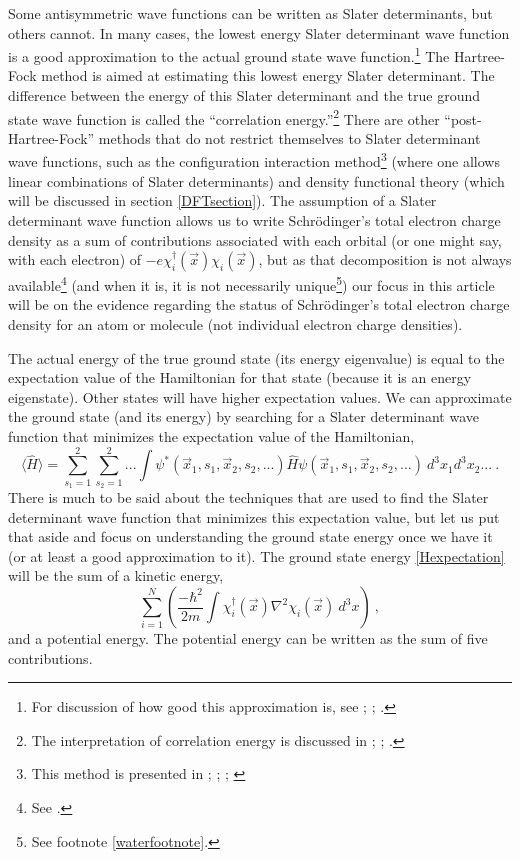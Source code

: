 \documentclass[onecolumn,secnumarabic,amsmath,amssymb,balancelastpage,nofootinbib]{article}
\begin{document}
Some antisymmetric wave functions can be written as Slater determinants, but others cannot.  In many cases, the lowest energy Slater determinant wave function is a good approximation to the actual ground state wave function.\footnote{For discussion of how good this approximation is, see \cite[ch.\ 18]{slatervol2}; \cite[pg.\ 164]{scerri1994}; \cite[sec.\ 11.1]{levineQC}.}  The Hartree-Fock method is aimed at estimating this lowest energy Slater determinant.  The difference between the energy of this Slater determinant and the true ground state wave function is called the ``correlation energy.''\footnote{The interpretation of correlation energy is discussed in \cite[sec.\ II.C]{lowdin1958}; \cite[pg.\ 436]{blinder1965}; \cite[sec.\ 9.8]{mcquarrieQC}.}  There are other ``post-Hartree-Fock'' methods that do not restrict themselves to Slater determinant wave functions, such as the configuration interaction method\footnote{This method is presented in \cite[ch.\ 4]{szaboQC}; \cite[sec.\ 9.8]{mcquarrieQC}; \cite[sec.\ 9.6]{atkins2011}; \cite[sec.\ 16.2]{levineQC}} (where one allows linear combinations of Slater determinants) and density functional theory (which will be discussed in section \ref{DFTsection}).  The assumption of a Slater determinant wave function allows us to write Schr\"{o}dinger's total electron charge density as a sum of contributions associated with each orbital (or one might say, with each electron) of $-e\chi_i^{\dagger}(\vec{x})\chi_i(\vec{x})$, but as that decomposition is not always available\footnote{See \cite{scerri2000, scerri2001, spence2001, matta2002}.} (and when it is, it is not necessarily unique\footnote{See footnote \ref{waterfootnote}.}) our focus in this article will be on the evidence regarding the status of Schr\"{o}dinger's total electron charge density for an atom or molecule (not individual electron charge densities).

The actual energy of the true ground state (its energy eigenvalue) is equal to the expectation value of the Hamiltonian for that state (because it is an energy eigenstate).  Other states will have higher expectation values.  We can approximate the ground state (and its energy) by searching for a Slater determinant wave function that minimizes the expectation value of the Hamiltonian,
\begin{equation}
\langle \widehat{H} \rangle = \sum_{s_1=1}^{2}\sum_{s_2=1}^{2}...\int{\psi^{*}(\vec{x}_1, s_1,\vec{x}_2, s_2, ...)\widehat{H}\psi(\vec{x}_1, s_1,\vec{x}_2, s_2, ...) \ d^3 x_1 d^3 x_2 ...}
\ .
\label{Hexpectation}
\end{equation}
There is much to be said about the techniques that are used to find the Slater determinant wave function that minimizes this expectation value, but let us put that aside and focus on understanding the ground state energy once we have it (or at least a good approximation to it).  The ground state energy \eqref{Hexpectation} will be the sum of a kinetic energy,
\begin{equation}
\sum_{i=1}^{N}\left(\frac{-\hbar^2}{2 m} \int{ \chi_i^{\dagger}(\vec{x})\nabla^2 \chi_i(\vec{x})\  d^3 x}\right)
\ ,
\label{electronkineticenergy}
\end{equation}
and a potential energy.  The potential energy can be written as the sum of five contributions.
\end{document}
